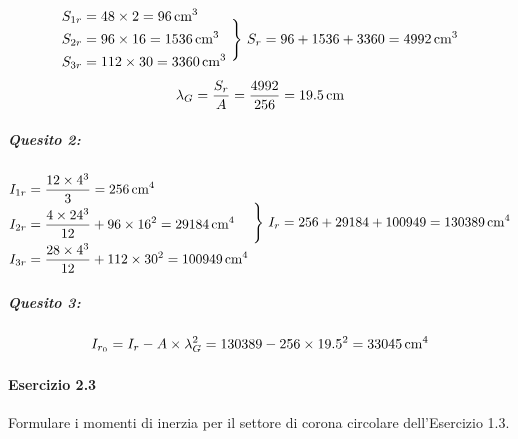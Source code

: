 \begin{equation*}
\begin{aligned}
S_{1r} &= 48\times 2 = 96\,\textup{cm}^3 \\
S_{2r} &= 96\times 16 = 1536\,\textup{cm}^3 \\
S_{3r} &= 112\times 30  = 3360\,\textup{cm}^3
\end{aligned}
\,\,\Biggr\}\,\, S_r = 96+1536+3360 = 4992\,\textup{cm}^3
\end{equation*}
\begin{equation*}
\lambda_G = \frac{S_r}{A} = \frac{4992}{256} = 19.5\,\textup{cm}
\end{equation*}
\subparagraph{Quesito 2:} 
\begin{equation*}
\begin{aligned}
I_{1r} &= \frac{12\times 4^{3}}{3} = 256\,\textup{cm}^4 \\
I_{2r} &= \frac{4\times 24^{3}}{12}+96\times 16^2 = 29184\,\textup{cm}^4 \\
I_{3r} &= \frac{28\times 4^{3}}{12}+112\times 30^2  = 100949\,\textup{cm}^4
\end{aligned}
\,\,\Biggr\}\,\, I_r = 256+29184+100949 = 130389\,\textup{cm}^4
\end{equation*}
\subparagraph{Quesito 3:}
\begin{equation*}
I_{r_0} = I_r -A\times \lambda_{G}^{2} = 130389-256\times 19.5^2 = 33045\,\textup{cm}^4
\end{equation*}
\clearpage
\paragraph{Esercizio 2.3}

\noindent Formulare i momenti di inerzia per il settore di corona circolare dell'Esercizio 1.3. 
\newline

